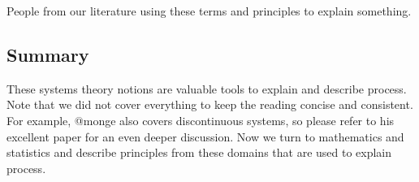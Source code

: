 \documentclass[]{article}
\begin{document}
People from our literature using these terms and principles to explain
something.

\hypertarget{summary}{%
\subsection{Summary}\label{summary}}

These systems theory notions are valuable tools to explain and describe
process. Note that we did not cover everything to keep the reading
concise and consistent. For example, @monge also covers discontinuous
systems, so please refer to his excellent paper for an even deeper
discussion. Now we turn to mathematics and statistics and describe
principles from these domains that are used to explain process.
\end{document}
